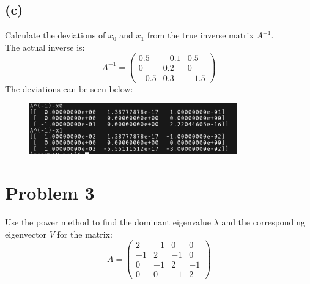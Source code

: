 \documentclass{article}
\begin{document}
\subsection*{(c)}
Calculate the deviations of $x_0$ and $x_1$ from the true inverse matrix $A^{-1}$.\\
The actual inverse is:
\[A^{-1}=\begin{pmatrix}0.5&-0.1&0.5\\0&0.2&0\\-0.5&0.3&-1.5\end{pmatrix}\]
The deviations can be seen below:
\begin{figure}[H]
    \centering
    \includegraphics[width=0.8\textwidth]{p2b.png}
\end{figure}

\section*{Problem 3}
Use the power method to find the dominant eigenvalue $\lambda$ and the corresponding eigenvector $V$ for the matrix:
\[A=\begin{pmatrix}2&-1&0&0\\-1&2&-1&0\\0&-1&2&-1\\0&0&-1&2\end{pmatrix}\]
\end{document}
